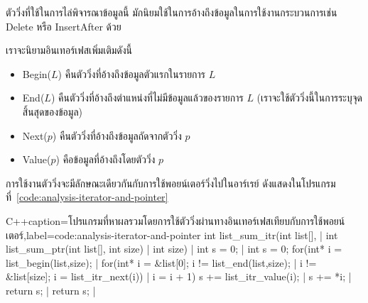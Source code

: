 ตัว{\wbr}วิ่ง{\wbr}ที่{\wbr}ใช้{\wbr}ใน{\wbr}การ{\wbr}ไล่{\wbr}พิจารณา{\wbr}ข้อมูล{\wbr}นี้ มัก{\wbr}นิยม{\wbr}ใช้{\wbr}ใน{\wbr}การ{\wbr}อ้าง{\wbr}ถึง{\wbr}ข้อมูล{\wbr}ใน{\wbr}การ{\wbr}ใช้{\wbr}งาน{\wbr}กระบวนการ{\wbr}เช่น{\wbr}
Delete หรือ InsertAfter ด้วย{\wbr}

เรา{\wbr}จะ{\wbr}นิยาม{\wbr}อิน{\wbr}เทอร์เฟส{\wbr}เพิ่มเติม{\wbr}ดังนี้{\wbr}
\begin{itemize}
\item Begin($L$) คืนตัว{\wbr}วิ่ง{\wbr}ที่{\wbr}อ้าง{\wbr}ถึง{\wbr}ข้อมูล{\wbr}ตัว{\wbr}แรก{\wbr}ใน{\wbr}รายการ $L$
\item End($L$) คืนตัว{\wbr}วิ่ง{\wbr}ที่{\wbr}อ้าง{\wbr}ถึง{\wbr}ตำแหน่ง{\wbr}ที่{\wbr}ไม่{\wbr}มี{\wbr}ข้อมูล{\wbr}แล้ว{\wbr}ของ{\wbr}รายการ $L$
  (เรา{\wbr}จะ{\wbr}ใช้{\wbr}ตัว{\wbr}วิ่ง{\wbr}นี้{\wbr}ใน{\wbr}การ{\wbr}ระบุ{\wbr}จุดสิ้นสุด{\wbr}ของ{\wbr}ข้อมูล)
\item Next($p$) คืนตัว{\wbr}วิ่ง{\wbr}ที่{\wbr}อ้าง{\wbr}ถึง{\wbr}ข้อมูล{\wbr}ถัดจาก{\wbr}ตัว{\wbr}วิ่ง $p$
\item Value($p$) คือ{\wbr}ข้อมูล{\wbr}ที่{\wbr}อ้าง{\wbr}ถึง{\wbr}โดย{\wbr}ตัว{\wbr}วิ่ง $p$
\end{itemize}

การ{\wbr}ใช้{\wbr}งาน{\wbr}ตัว{\wbr}วิ่ง{\wbr}จะ{\wbr}มี{\wbr}ลักษณะ{\wbr}เดียวกัน{\wbr}กับ{\wbr}การ{\wbr}ใช้{\wbr}พอยน์เตอร์{\wbr}วิ่ง{\wbr}ไป{\wbr}ใน{\wbr}อาร์เรย์ ดัง{\wbr}แสดง{\wbr}ใน{\wbr}โปรแกรม{\wbr}ที่~\ref{code:analysis-iterator-and-pointer}

\latintext
\begin{codelist}{C++}{caption={\thaitext โปรแกรม{\wbr}ที่{\wbr}หา{\wbr}ผลรวม{\wbr}โดย{\wbr}การ{\wbr}ใช้{\wbr}ตัว{\wbr}วิ่ง{\wbr}ผ่าน{\wbr}ทาง{\wbr}อิน{\wbr}เทอร์เฟส{\wbr}เทียบ{\wbr}กับ{\wbr}การ{\wbr}ใช้{\wbr}พอยน์เตอร์\latintext},label=code:analysis-iterator-and-pointer}
int list_sum_itr(int list[],          | int list_sum_ptr(int list[],
                 int size)            |                  int size)
{                                     | {
  int s = 0;                          |   int s = 0;
  for(int* i = list_begin(list,size); |   for(int* i = &list[0];
      i != list_end(list,size);       |       i != &list[size];
      i = list_itr_next(i)) {         |       i = i + 1) {
    s += list_itr_value(i);           |     s += *i;
  }                                   |   }
  return s;                           |   return s;
}                                     | }
\end{codelist}
\thaitext

